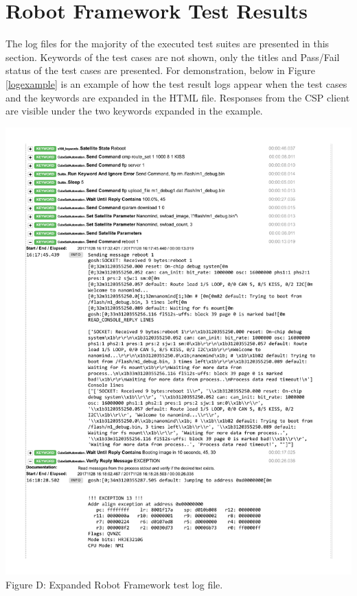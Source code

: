 \documentclass[english,12pt,a4paper,pdftex,elec,utf8]{aaltothesis}
\begin{document}
\section{Robot Framework Test Results\label{LiiteC}}
The log files for the majority of the executed test suites are presented in this section.
Keywords of the test cases are not shown, only the titles and Pass/Fail status of the test cases are presented. For demonstration, below in Figure \ref{logexample} is an example of how the test result logs appear when the test cases and the keywords are expanded in the HTML file. Responses from the CSP client are visible under the two keywords expanded in the example.\par
\begin{center}
\includegraphics[scale=0.63]{result_pdf/example.pdf}\\
Figure D: Expanded Robot Framework test log file.
\label{logexample}
\end{center}
\end{document}
